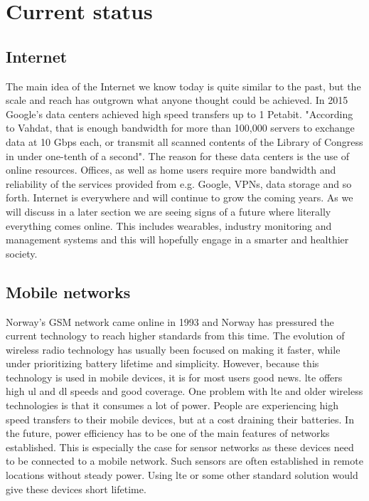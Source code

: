 \documentclass[USenglish]{ifimaster}  %
\begin{document}
\section{Current status}
\subsection{Internet}
The main idea of the Internet we know today is quite similar to the past, but the scale and reach has outgrown what anyone thought could be achieved. In 2015 Google's data centers achieved high speed transfers up to 1 Petabit. "According to Vahdat, that is enough bandwidth for more than 100,000 servers to exchange data at 10 Gbps each, or transmit all scanned contents of the Library of Congress in under one-tenth of a second"\cite{online:petabitGoogle}. The reason for these data centers is the use of online resources. Offices, as well as home users require more bandwidth and reliability of the services provided from e.g. Google, VPNs, data storage and so forth.
Internet is everywhere and will continue to grow the coming years. As we will discuss in a later section we are seeing signs of a future where literally everything comes online. This includes wearables, industry monitoring and management systems and this will hopefully engage in a smarter and healthier society.

\subsection{Mobile networks}
Norway's GSM network came online in 1993 \cite{online:gsmTelenorNetcom} and Norway has pressured the current technology to reach higher standards from this time. The evolution of wireless radio technology has usually been focused on making it faster, while under prioritizing battery lifetime and simplicity. However, because this technology is used in mobile devices, it is for most users good news. \acrshort{lte} offers high \acrfull{ul} and \acrfull{dl} speeds and good coverage. One problem with \acrshort{lte} and older wireless technologies is that it consumes a lot of power. People are experiencing high speed transfers to their mobile devices, but at a cost draining their batteries. In the future, power efficiency has to be one of the main features of networks established. This is especially the case for sensor networks as these devices need to be connected to a mobile network. Such sensors are often established in remote locations without steady power. Using \acrshort{lte} or some other standard solution would give these devices short lifetime.
\end{document}
